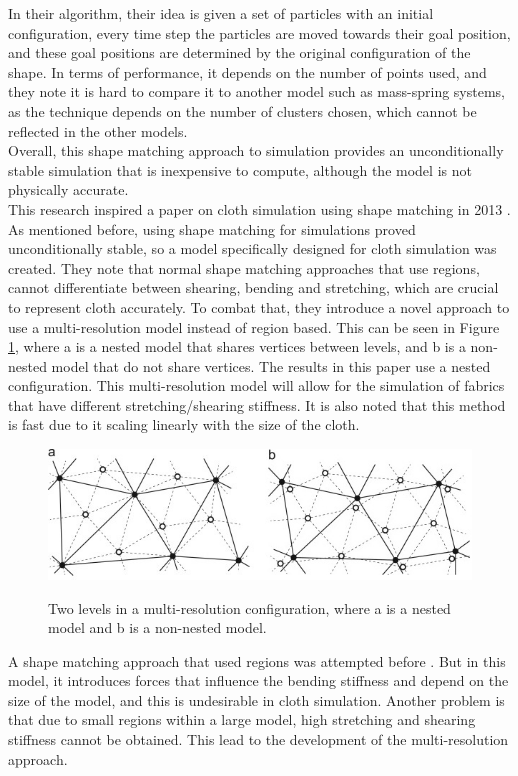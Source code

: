 \documentclass[12pt,a4paper]{article}
\begin{document}
In their algorithm, their idea is given a set of particles with an initial configuration, every time step the particles are moved towards their goal position, and these goal positions are determined by the original configuration of the shape. In terms of performance, it depends on the number of points used, and they note it is hard to compare it to another model such as mass-spring systems, as the technique depends on the number of clusters chosen, which cannot be reflected in the other models.\\
Overall, this shape matching approach to simulation provides an unconditionally stable simulation that is inexpensive to compute, although the model is not physically accurate.\\

This research inspired a paper on cloth simulation using shape matching in 2013 \cite{BENDER2013945}. As mentioned before, using shape matching for simulations proved unconditionally stable, so a model specifically designed for cloth simulation was created. They note that normal shape matching approaches that use regions, cannot differentiate between shearing, bending and stretching, which are crucial to represent cloth accurately. To combat that, they introduce a novel approach to use a multi-resolution model instead of region based. This can be seen in Figure \ref{fig:shape}, where a is a nested model that shares vertices between levels, and b is a non-nested model that do not share vertices. The results in this paper use a nested configuration. This multi-resolution model will allow for the simulation of fabrics that have different stretching/shearing stiffness. It is also noted that this method is fast due to it scaling linearly with the size of the cloth. \\

\begin{figure}[h]
	\caption{Two levels in a multi-resolution configuration, where a is a nested model and b is a non-nested model.}
	\includegraphics{shapeMatching.jpg}
	\label{fig:shape}
\end{figure} 
A shape matching approach that used regions was attempted before \cite{regionshapecloth}. But in this model, it introduces forces that influence the bending stiffness and depend on the size of the model, and this is undesirable in cloth simulation. Another problem is that due to small regions within a large model, high stretching and shearing stiffness cannot be obtained. This lead to the development of the multi-resolution approach.\\
\end{document}
